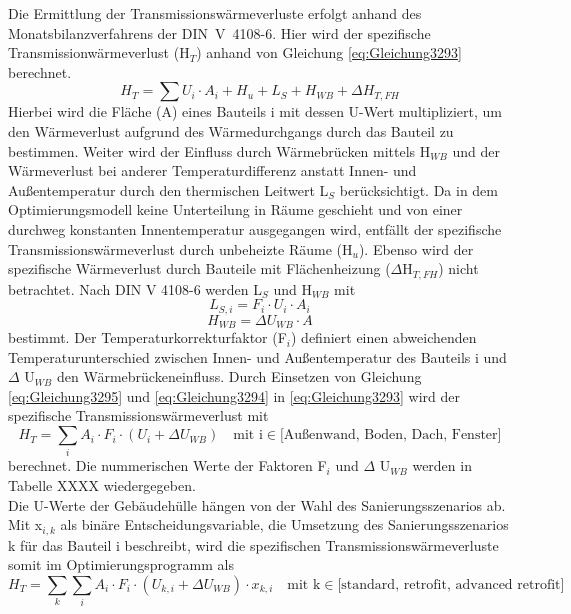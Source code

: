 Die Ermittlung der Transmissionswärmeverluste erfolgt anhand des Monatsbilanzverfahrens der \mbox{DIN V 4108-6.}
Hier wird der spezifische Transmissionwärmeverlust (H\(_T\)) anhand von Gleichung \ref{eq:Gleichung3293} berechnet.
\begin{equation}
\label{eq:Gleichung3293}
H_T = \sum U_i \cdot A_i + H_u + L_S + H_{WB} + \Delta H_{T,FH}
\end{equation}
Hierbei wird die Fläche (A) eines Bauteils i mit dessen U-Wert multipliziert, um den Wärmeverlust aufgrund des Wärmedurchgangs durch das Bauteil zu bestimmen.
Weiter wird der Einfluss durch Wärmebrücken mittels H\(_{WB}\) und der Wärmeverlust bei anderer Temperaturdifferenz anstatt Innen- und Außentemperatur durch den thermischen Leitwert L\(_S\) berücksichtigt.
Da in dem Optimierungsmodell keine Unterteilung in Räume geschieht und von einer durchweg konstanten Innentemperatur ausgegangen wird, entfällt der spezifische Transmissionswärmeverlust durch unbeheizte Räume (H\(_u\)).
Ebenso wird der spezifische Wärmeverlust durch Bauteile mit Flächenheizung (\(\Delta\)H\(_{T,FH}\)) nicht betrachtet.
Nach DIN V 4108-6 werden L\(_S\) und H\(_{WB}\) mit
\begin{equation}
\label{eq:Gleichung3294}
L_{S,i} = F_i \cdot U_i \cdot A_i
\end{equation}
\begin{equation}
\label{eq:Gleichung3295}
H_{WB} = \Delta U_{WB} \cdot A
\end{equation}
bestimmt. 
Der Temperaturkorrekturfaktor (F\(_i\)) definiert einen abweichenden Temperaturunterschied zwischen Innen- und Außentemperatur des Bauteils i und \(\Delta\) U\(_{WB}\) den Wärmebrückeneinfluss.
Durch Einsetzen von Gleichung \ref{eq:Gleichung3295} und \ref{eq:Gleichung3294} in \ref{eq:Gleichung3293} wird der spezifische Transmissionswärmeverlust mit
\begin{equation}
\label{eq:Gleichung3296}
H_T = \sum_{i} A_i \cdot F_i \cdot (U_i + \Delta U_{WB}) \quad \text{mit i} \in \text{[Außenwand, Boden, Dach, Fenster]}
\end{equation}
berechnet.
Die nummerischen Werte der Faktoren F\(_i\) und \(\Delta\) U\(_{WB}\) werden in Tabelle XXXX wiedergegeben.\\
Die U-Werte der Gebäudehülle hängen von der Wahl des Sanierungsszenarios ab.
Mit x\(_{i,k}\) als binäre Entscheidungsvariable, die Umsetzung des Sanierungsszenarios k für das Bauteil i beschreibt, wird die spezifischen Transmissionswärmeverluste somit im Optimierungsprogramm als
\begin{equation}
\label{eq:Gleichung3297}
H_T = \sum_{k} \sum_{i}  A_i \cdot F_i \cdot (U_{k,i} + \Delta U_{WB}) \cdot x_{k,i} \quad \text{mit k}  \in \text{[standard, retrofit, advanced retrofit]}
\end{equation}

